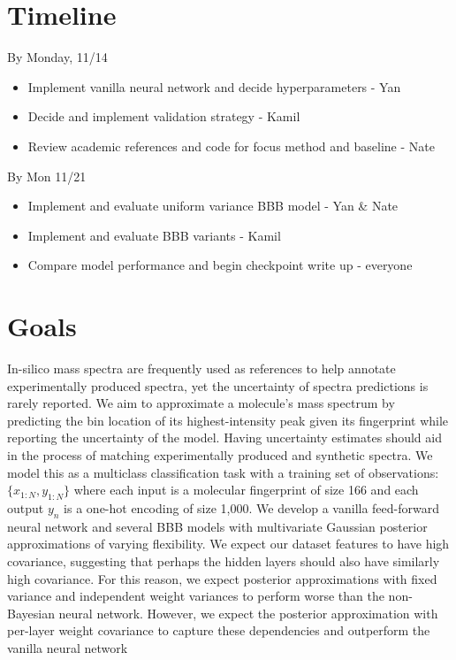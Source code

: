 \documentclass{article}
\begin{document}
\section{Timeline}
By Monday, 11/14
\begin{itemize}
    \item Implement vanilla neural network and decide hyperparameters - Yan
    \item Decide and implement validation strategy - Kamil
    \item Review academic references and code for focus method and baseline - Nate
\end{itemize}
By Mon 11/21
\begin{itemize}
    \item Implement and evaluate uniform variance BBB model - Yan \& Nate
    \item Implement and evaluate BBB variants - Kamil
    \item Compare model performance and begin checkpoint write up - everyone
\end{itemize}

\section{Goals}
In-silico mass spectra are frequently used as references to help annotate experimentally produced spectra, yet the uncertainty of spectra predictions is rarely reported. We aim to approximate a molecule’s mass spectrum by predicting the bin location of its highest-intensity peak given its fingerprint while reporting the uncertainty of the model. Having uncertainty estimates should aid in the process of matching experimentally produced and synthetic spectra. We model this as a multiclass classification task with a training set of observations: $\{x_{1:N}, y_{1:N}\}$ where each input  is a molecular fingerprint of size 166 and each output $y_n$ is a one-hot encoding of size 1,000. We develop a vanilla feed-forward neural network and several BBB models with multivariate Gaussian posterior approximations of varying flexibility. We expect our dataset features to have high covariance, suggesting that perhaps the hidden layers should also have similarly high covariance. For this reason, we expect posterior approximations with fixed variance and independent weight variances to perform worse than the non-Bayesian neural network. However, we expect the posterior approximation with per-layer weight covariance to capture these dependencies and outperform the vanilla neural network
\end{document}

